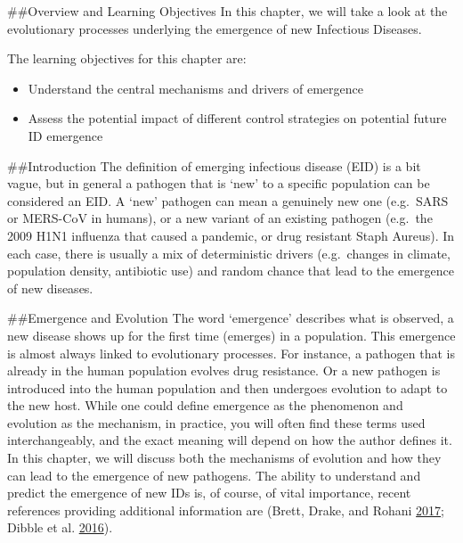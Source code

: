 \documentclass[]{book}
\providecommand{\tightlist}{%
  \setlength{\itemsep}{0pt}\setlength{\parskip}{0pt}}
\theoremstyle{definition}
\theoremstyle{definition}
\theoremstyle{definition}
\theoremstyle{remark}
\begin{document}
\#\#Overview and Learning Objectives In this chapter, we will take a
look at the evolutionary processes underlying the emergence of new
Infectious Diseases.

The learning objectives for this chapter are:

\begin{itemize}
\tightlist
\item
  Understand the central mechanisms and drivers of emergence
\item
  Assess the potential impact of different control strategies on
  potential future ID emergence
\end{itemize}

\#\#Introduction The definition of emerging infectious disease (EID) is
a bit vague, but in general a pathogen that is `new' to a specific
population can be considered an EID. A `new' pathogen can mean a
genuinely new one (e.g.~SARS or MERS-CoV in humans), or a new variant of
an existing pathogen (e.g.~the 2009 H1N1 influenza that caused a
pandemic, or drug resistant Staph Aureus). In each case, there is
usually a mix of deterministic drivers (e.g.~changes in climate,
population density, antibiotic use) and random chance that lead to the
emergence of new diseases.

\#\#Emergence and Evolution The word `emergence' describes what is
observed, a new disease shows up for the first time (emerges) in a
population. This emergence is almost always linked to evolutionary
processes. For instance, a pathogen that is already in the human
population evolves drug resistance. Or a new pathogen is introduced into
the human population and then undergoes evolution to adapt to the new
host. While one could define emergence as the phenomenon and evolution
as the mechanism, in practice, you will often find these terms used
interchangeably, and the exact meaning will depend on how the author
defines it. In this chapter, we will discuss both the mechanisms of
evolution and how they can lead to the emergence of new pathogens. The
ability to understand and predict the emergence of new IDs is, of
course, of vital importance, recent references providing additional
information are (Brett, Drake, and Rohani
\protect\hyperlink{ref-brett17}{2017}; Dibble et al.
\protect\hyperlink{ref-dibble16}{2016}).
\end{document}
